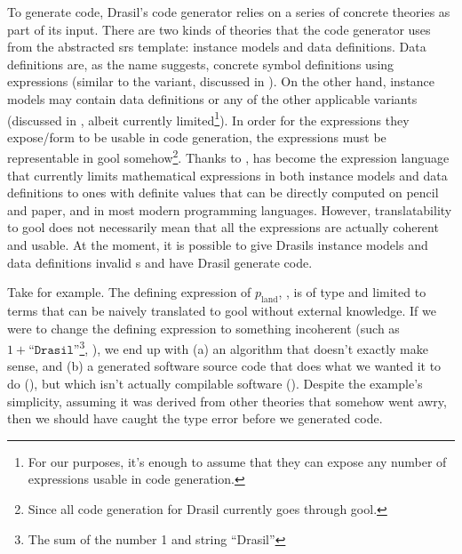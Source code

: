 To generate code, Drasil's code generator relies on a series of concrete
theories as part of its input. There are two kinds of theories that the code
generator uses from the abstracted \acs{srs} template: instance models and data
definitions. Data definitions are, as the name suggests, concrete symbol
definitions using expressions (similar to the \EquationalModel{} \ModelKind{}
variant, discussed in ). On the other hand, instance
models may contain data definitions or any of the other applicable \ModelKinds{}
variants (discussed in , albeit currently
limited\footnote{For our purposes, it's enough to assume that they can expose
any number of expressions usable in code generation.}). In order for the
expressions they expose/form to be usable in code generation, the expressions
must be representable in \acs{gool} somehow\footnote{Since all code generation
for Drasil currently goes through \acs{gool}.}. Thanks to
, \Expr{} has become the expression language that
currently limits mathematical expressions in both instance models and data
definitions to ones with definite values that can be directly computed on pencil
and paper, and in most modern programming languages. However, translatability to
\acs{gool} does not necessarily mean that all the expressions are actually
coherent and usable. At the moment, it is possible to give Drasils instance
models and data definitions invalid \Expr{}s and have Drasil generate code.

\pseudoExampleLandPosQDBadTyping{}

Take  for example. The defining expression of
\(p_\text{land}\), , is of type \Expr{} and limited to
terms that can be naively translated to \acs{gool} without external knowledge.
If we were to change the defining expression to something incoherent (such as
\(1 + \texttt{``Drasil''}\)\footnote{The sum of the number 1 and string
``Drasil''}, ), we end up with (a) an
algorithm that doesn't exactly make sense, and (b) a generated software source
code that does what we wanted it to do
(), but which isn't actually
compilable software ().
Despite the example's simplicity, assuming it was derived from other theories
that somehow went awry, then we should have caught the type error before we
generated code.

\pseudoExampleLandPosQDBadTypingJavaCode{}

